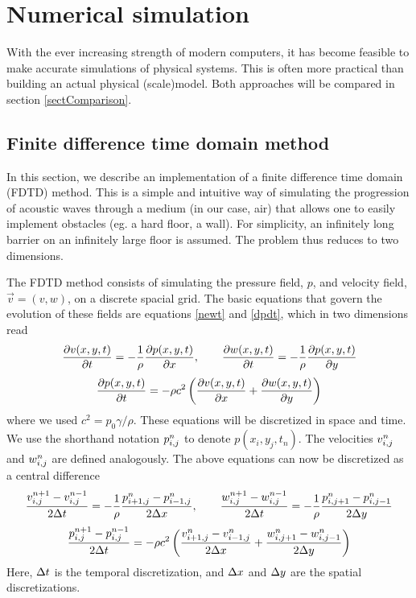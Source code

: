 \section{Numerical simulation \label{sectSimulation}}
With the ever increasing strength of modern computers, it has become feasible to make accurate simulations of physical systems. This is often more practical than building an actual physical (scale)model. Both approaches will be compared in section \ref{sectComparison}.


\subsection{Finite difference time domain method}
In this section, we describe an implementation of a finite difference time domain (FDTD) method. This is a simple and intuitive way of simulating the progression of acoustic waves through a medium (in our case, air) that allows one to easily implement obstacles (eg. a hard floor, a wall). For simplicity, an infinitely long barrier on an infinitely large floor is assumed. The problem thus reduces to two dimensions.

The FDTD method consists of simulating the pressure field, $p$, and velocity field, $\vec{v} = (v, w)$,  on a discrete spacial grid. The basic equations that govern the evolution of these fields are equations \ref{newt} and \ref{dpdt}, which in two dimensions read
{\small 
$$
\frac{\partial v(x,y,t)}{\partial t} = -\frac{1}{\rho} \frac{\partial p(x,y,t)}{\partial x}
, \qquad
\frac{\partial w(x,y,t)}{\partial t} = -\frac{1}{\rho} \frac{\partial p(x,y,t)}{\partial y}
$$
$$
\frac{\partial p(x,y,t)}{\partial t} = -\rho c^2 \left(\frac{\partial v(x,y,t)}{\partial x} + \frac{\partial w(x,y,t)}{\partial y}\right)
$$}
where we used $c^2 = p_0 \gamma / \rho$. These equations will be discretized in space and time. We use the shorthand notation $p_{i,j}^n$ to denote $p(x_i, y_j, t_n)$. The velocities $v_{i,j}^n$ and $w_{i,j}^n$ are defined analogously. The above equations can now be discretized as a central difference
{\small 
$$
\frac{v_{i,j}^{n+1} - v_{i,j}^{n-1}}{2\Delta t} = -\frac{1}{\rho} \frac{p^n_{i+1,j} - p^n_{i-1,j}}{2\Delta x}
, \qquad
\frac{w_{i,j}^{n+1} - w_{i,j}^{n-1}}{2\Delta t} = -\frac{1}{\rho} \frac{p^n_{i,j+1} - p^n_{i,j-1}}{2\Delta y}
$$
$$
\frac{p_{i,j}^{n+1} - p_{i,j}^{n-1}}{2\Delta t} = 
	-\rho c^2 \left(
		\frac{v^n_{i+1,j} - v^n_{i-1,j}}{2\Delta x}
		+ \frac{w^n_{i,j+1} - w^n_{i,j-1}}{2\Delta y}
	\right)
$$}
Here, $\Delta t$ is the temporal discretization, and $\Delta x$ and $\Delta y$ are the spatial discretizations.


